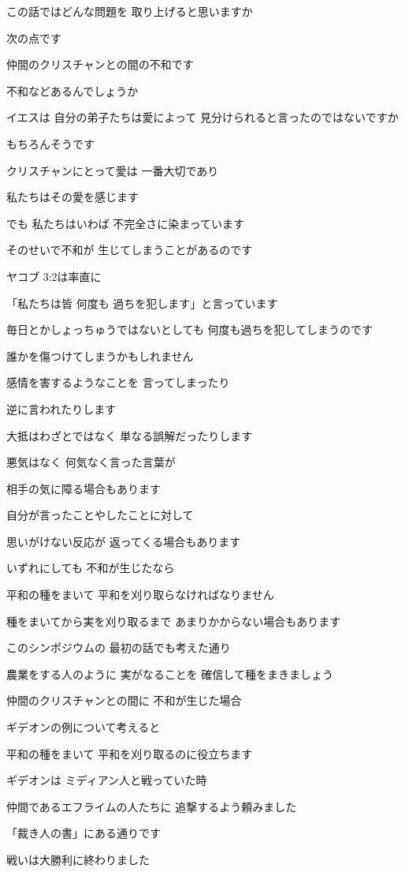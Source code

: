 \documentclass[twocolumn]{jsarticle}
\begin{document}
この話ではどんな問題を
取り上げると思いますか

次の点です

仲間のクリスチャンとの間の不和です

不和などあるんでしょうか

イエスは 自分の弟子たちは愛によって
見分けられると言ったのではないですか

もちろんそうです

クリスチャンにとって愛は
一番大切であり

私たちはその愛を感じます

でも 私たちはいわば
不完全さに染まっています

そのせいで不和が
生じてしまうことがあるのです

ヤコブ 3:2は率直に

「私たちは皆 何度も
過ちを犯します」と言っています

毎日とかしょっちゅうではないとしても
何度も過ちを犯してしまうのです

誰かを傷つけてしまうかもしれません

感情を害するようなことを
言ってしまったり

逆に言われたりします

大抵はわざとではなく
単なる誤解だったりします

悪気はなく 何気なく言った言葉が

相手の気に障る場合もあります

自分が言ったことやしたことに対して

思いがけない反応が
返ってくる場合もあります

いずれにしても 不和が生じたなら

平和の種をまいて
平和を刈り取らなければなりません

種をまいてから実を刈り取るまで
あまりかからない場合もあります

このシンポジウムの
最初の話でも考えた通り

農業をする人のように 実がなることを
確信して種をまきましょう

仲間のクリスチャンとの間に
不和が生じた場合

ギデオンの例について考えると

平和の種をまいて
平和を刈り取るのに役立ちます

ギデオンは
ミディアン人と戦っていた時

仲間であるエフライムの人たちに
追撃するよう頼みました

「裁き人の書」にある通りです

戦いは大勝利に終わりました
\end{document}
